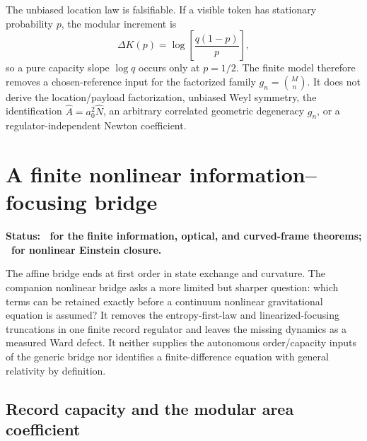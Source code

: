 The unbiased location law is falsifiable.  If a visible token has stationary
probability \(p\), the modular increment is
\begin{equation}
 \Delta K(p)=\log\!\left[\frac{q(1-p)}{p}\right],
 \label{eq:reference-bias-control}
\end{equation}
so a pure capacity slope \(\log q\) occurs only at \(p=1/2\).  The finite
model therefore removes a chosen-reference input for the factorized family
\(g_n=\binom{M}{n}\).  It does not derive the location/payload
factorization, unbiased Weyl symmetry, the identification
\(\widehat A=a_0^2\widehat N\), an arbitrary correlated geometric
degeneracy \(g_n\), or a regulator-independent Newton coefficient.

\section{A finite nonlinear information--focusing bridge}
\label{sec:nonlinear-information-focusing}

\textbf{Status: \StatusModel\ for the finite information, optical, and
curved-frame theorems; \StatusConditional\ for nonlinear Einstein closure.}

The affine bridge ends at first order in state exchange and curvature.  The
companion nonlinear bridge \cite{XuNonlinearInformationFocusing2026} asks a
more limited but sharper question: which terms can be retained exactly
before a continuum nonlinear gravitational equation is assumed?  It removes
the entropy-first-law and linearized-focusing truncations in one finite
record regulator and leaves the missing dynamics as a measured Ward defect.
It neither supplies the autonomous order/capacity inputs of the generic
bridge nor identifies a finite-difference equation with general relativity
by definition.

\subsection{Record capacity and the modular area coefficient}

